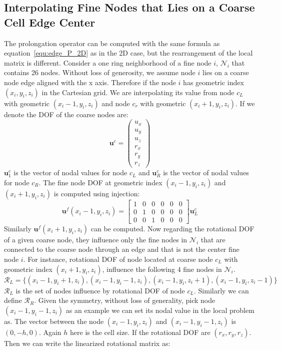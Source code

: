 \subsection{Interpolating Fine Nodes that Lies on a Coarse Cell Edge Center}
The prolongation operator can be computed with the same formula as equation~\ref{equ:edge_P_2D} as in the 2D case, but the rearrangement of the local matrix is different. Consider a one ring neighborhood of a fine node $i$, $\mathcal{N}_i$ that contains 26 nodes. Without loss of generosity, we assume node $i$ lies on a coarse node edge aligned with the x axis. Therefore if the node $i$ has geometric index $(x_i, y_i, z_i)$ in the Cartesian grid. We are interpolating its value from node $c_L$ with geometric $(x_i - 1, y_i, z_i)$ and node $c_r$ with geometric $(x_i + 1, y_i, z_i)$. If we denote the DOF of the coarse nodes are:
$$
\mathbf{u}^c = \left(\begin{array}{c}u_x\\u_y\\u_z\\r_x\\r_y\\r_z\end{array}\right)
$$
$\mathbf{u}^c_1$ is the vector of nodal values for node $c_L$ and $\mathbf{u}^c_R$ is the vector of nodal values for node $c_R$. The fine node DOF at geometric index $(x_i - 1, y_i, z_i)$ and $(x_i + 1, y_i, z_i)$ is computed using injection:
 \begin{equation}
 \mathbf{u}^f(x_i - 1, y_i, z_i) = \begin{bmatrix} 
 1 & 0 & 0 & 0 & 0 & 0\\
 0 & 1 & 0 & 0 & 0 & 0\\
 0 & 0 & 1 & 0 & 0 & 0 \end{bmatrix} \mathbf{u}^c_L
 \end{equation}
 Similarly $\mathbf{u}^f(x_i + 1, y_i, z_i)$ can be computed. Now regarding the rotational DOF of a given coarse node, they influence only the fine nodes in $\mathcal{N}_i$ that are connected to the coarse node through an edge and that is not the center fine node $i$. For instance, rotational DOF of node located at coarse node $c_L$ with geometric index $(x_i + 1, y_i, z_i)$, influence the following $4$ fine nodes in $\mathcal{N}_i$.
 \begin{equation}
 \mathcal{R}_L = \{(x_i - 1, y_i+1, z_i),(x_i - 1, y_i-1, z_i),(x_i - 1, y_i, z_i+1), (x_i - 1, y_i, z_i-1)\}
 \end{equation}
$\mathcal{R}_L$ is the set of nodes influence by rotational DOF of node $c_L$. Similarly we can define $\mathcal{R}_R$. Given the symmetry, without loss of generality, pick node $(x_i - 1, y_i - 1, z_i)$ as an example we can set its nodal value in the local problem as. The vector between the node $(x_i - 1, y_i, z_i)$ and $(x_i - 1, y_i - 1, z_i)$ is $(0,-h,0)$. Again $h$ here is the cell size. If the rotational DOF are $(r_x,r_y,r_z)$. Then we can write the linearized rotational matrix as:
